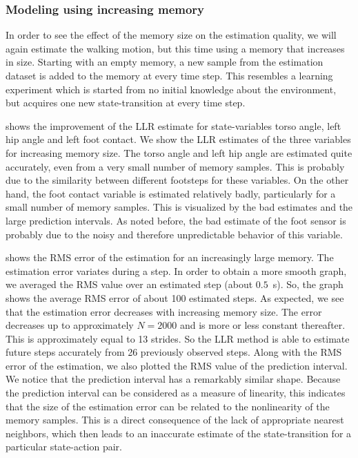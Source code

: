 \subsubsection{Modeling using increasing memory}\label{sec:LLR-Leo_IncrMemory} 
In order to see the effect of the memory size on the estimation quality, we will again estimate the walking motion, but this time using a memory that increases in size. Starting with an empty memory, a new sample from the estimation dataset is added to the memory at every time step. This resembles a learning experiment which is started from no initial knowledge about the environment, but acquires one new state-transition at every time step.

 shows the improvement of the \ac{LLR} estimate for state-variables torso angle, left hip angle and left foot contact. We show the \ac{LLR} estimates of the three variables for increasing memory size. The torso angle and left hip angle are estimated quite accurately, even from a very small number of memory samples. This is probably due to the similarity between different footsteps for these variables. On the other hand, the foot contact variable is estimated relatively badly, particularly for a small number of memory samples. This is visualized by the bad estimates and the large prediction intervals. As noted before, the bad estimate of the foot sensor is probably due to the noisy and therefore unpredictable behavior of this variable.
 
 shows the \ac{RMS} error of the estimation for an increasingly large memory. The estimation error variates during a step. In order to obtain a more smooth graph, we averaged the \ac{RMS} value over an estimated step (about $0.5$~s). So, the graph shows the average \ac{RMS} error of about 100 estimated steps. As expected, we see that the estimation error decreases with increasing memory size. The error decreases up to approximately $N = 2000$ and is more or less constant thereafter. This is approximately equal to 13 strides. So the \ac{LLR} method is able to estimate future steps accurately from 26 previously observed steps. Along with the RMS error of the estimation, we also plotted the \ac{RMS} value of the prediction interval. We notice that the prediction interval has a remarkably similar shape. Because the prediction interval can be considered as  a measure of linearity, this indicates that the size of the estimation error can be related to the nonlinearity of the memory samples. This is a direct consequence of the lack of appropriate nearest neighbors, which then leads to an inaccurate estimate of the state-transition for a particular state-action pair.

